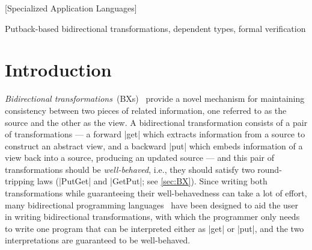 \documentclass{sigplanconf}
\renewcommand{\emph}{\textsl}
\begin{document}
[Specialized Application Languages]


\keywords
Putback-based bidirectional transformations,
dependent types,
formal verification

\section{Introduction}
\label{sec:introduction}


\emph{Bidirectional transformations}~(BXs)~\cite{GRACE:09} provide a novel mechanism for maintaining consistency between two pieces of related information, one referred to as the source and the other as the view.
A bidirectional transformation consists of a pair of transformations ---
a forward |get| which extracts information from a source to construct an abstract view,
and a backward |put| which embeds information of a view back into a source, producing an updated source --- and this pair of transformations should be \emph{well-behaved}, i.e., they should satisfy two round-tripping laws (|PutGet| and |GetPut|; see \autoref{sec:BX}).
Since writing both transformations while guaranteeing their well-behavedness can take a lot of effort,
many bidirectional programming languages~\cite{Foster-lenses,Bohannon:06,MHNHT07,Hidaka:10,PachecoCunha:10,Barbosa:2010,Hofmann:2011,FoPP08,HoPW12} have been designed
to aid the user in writing bidirectional transformations,
with which the programmer only needs to write one program that can be interpreted either as |get| or |put|, and the two interpretations are guaranteed to be well-behaved.
\end{document}
